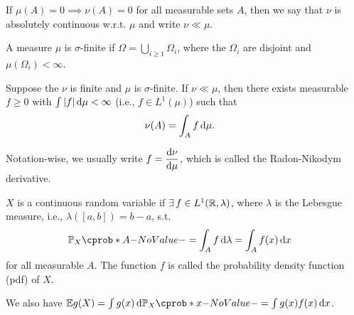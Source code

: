 \documentclass[12pt]{article}
\begin{document}
\begin{Definition}\label{wk4:def:expectation continuous}
If $\mu (A) =0 \implies \nu(A)=0$ for all measurable sets $A$, then we say that $\nu$ is absolutely continuous w.r.t. $\mu$ and write $\nu \ll \mu$.
\end{Definition}

A measure $\mu$ is $\sigma$-finite if $\Omega= \bigcup_{i\geq 1}{\Omega_i}$, where the $\Omega_i$ are disjoint and $\mu(\Omega_i)<\infty$.

\begin{Theorem}\label{wk4:Radon-Nikodym Theorem}
Suppose the $\nu$ is finite and $\mu$ is $\sigma$-finite. If $\nu \ll \mu$, then there exists measurable $f \geq 0$ with $ \int {|f|} \,\mathrm{d} \mu <\infty$ (i.e., $f\in L^1(\mu)$) such that
\begin{align*}
\nu(A) & = \int_{A} f \,\mathrm{d}\mu.
\end{align*}
\end{Theorem}
Notation-wise, we usually write $f = {\dfrac{\mathrm{d} {\nu}}{\mathrm{d} {\mu}}}$, which is called the Radon-Nikodym derivative. 

\begin{Definition}
$X$ is a continuous random variable if $\exists f \in L^1(\Real,\lambda)$, where $\lambda$ is the Lebesgue measure, i.e., $\lambda([a,b])=b-a$, s.t.\
\begin{align*}
\P_X(A)& =\int_{A} f \ud\lambda =\int_{A} f(x) \ud x
\end{align*}
for all measurable $A$. The function $f$ is called the probability density function (pdf) of $X$. 
\end{Definition}
We also have $ \E g(X) = \int g(x) \ud \P_X(x) = \int g(x) f(x) \ud x$.



%

\end{document}

